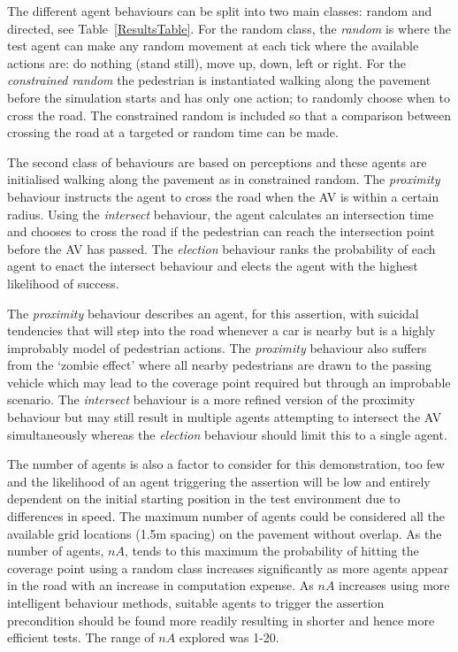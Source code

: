 \documentclass[letterpaper, 10 pt, journal, twoside]{IEEEtran}
\begin{document}
The different agent behaviours can be split into two main classes: random and directed, see Table~\ref{ResultsTable}. For the random class, the \textit{random} is where the test agent can make any random movement at each tick where the available actions are: do nothing (stand still), move up, down, left or right. For the \textit{constrained random} the pedestrian is instantiated walking along the pavement before the simulation starts and has only one action; to randomly choose when to cross the road. The constrained random is included so that a comparison between crossing the road at a targeted or random time can be made. 

The second class of behaviours are based on perceptions and these agents are initialised walking along the pavement as in constrained random. The \textit{proximity} behaviour instructs the agent to cross the road when the AV is within a certain radius. Using the \textit{intersect} behaviour, the agent calculates an intersection time and chooses to cross the road if the pedestrian can reach the intersection point before the AV has passed. The \textit{election} behaviour ranks the probability of each agent to enact the intersect behaviour and elects the agent with the highest likelihood of success.

The \textit{proximity} behaviour describes an agent, for this assertion, with suicidal tendencies that will step into the road whenever a car is nearby but is a highly improbably model of pedestrian actions. The \textit{proximity} behaviour also suffers from the `zombie effect' where all nearby pedestrians are drawn to the passing vehicle which may lead to the coverage point required but through an improbable scenario. The \textit{intersect} behaviour is a more refined version of the proximity behaviour but may still result in multiple agents attempting to intersect the AV simultaneously whereas the \textit{election} behaviour should limit this to a single agent.

The number of agents is also a factor to consider for this demonstration, too few and the likelihood of an agent triggering the assertion will be low and entirely dependent on the initial starting position in the test environment due to differences in speed. The maximum number of agents could be considered all the available grid locations (1.5m spacing) on the pavement without overlap.
As the number of agents, $nA$, tends to this maximum the probability of hitting the coverage point using a random class increases significantly as more agents appear in the road with an increase in computation expense. As $nA$ increases using more intelligent behaviour methods, suitable agents to trigger the assertion precondition should be found more readily resulting in shorter and hence more efficient tests. The range of $nA$ explored was 1-20.
\end{document}
